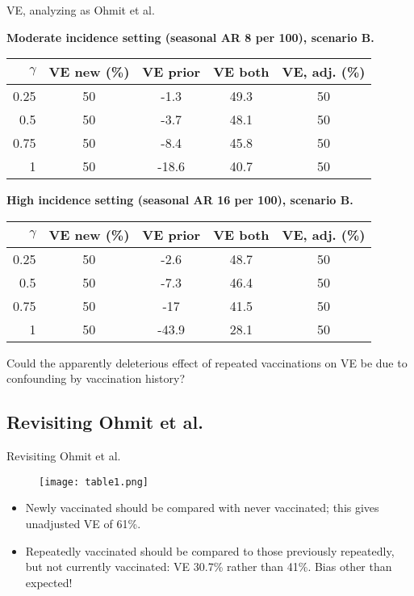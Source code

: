 \documentclass{beamer}
\begin{document}
 \begin{frame}{VE, analyzing as Ohmit et al.}
	
	{\footnotesize
		\textbf{Moderate incidence setting (seasonal AR 8 per 100), scenario B.}
		\begin{table}
			\begin{tabular}{rcccc}
				$\gamma$ & VE new (\%) & VE prior & VE both & VE, adj.  (\%) \\
				\hline
				0.25 & 50 & -1.3 & 49.3 & 50 \\ 
				0.5 & 50 & -3.7 & 48.1 & 50 \\ 
				0.75 & 50 & -8.4 & 45.8 & 50 \\ 
				1 & 50 & -18.6 & 40.7 & 50 \\ 
				\hline
			\end{tabular}
		\end{table}
		
		
		\textbf{High incidence setting (seasonal AR 16 per 100), scenario B.}
		\begin{table}
			\begin{tabular}{rcccc}
				$\gamma$ & VE new (\%) & VE prior & VE both & VE, adj.  (\%) \\
				\hline
				0.25 & 50 & -2.6 & 48.7 & 50 \\ 
				0.5 & 50 & -7.3 & 46.4 & 50 \\ 
				0.75 & 50 & -17 & 41.5 & 50 \\ 
				1 & 50 & -43.9 & 28.1 & 50 \\ 
				\hline
			\end{tabular}
		\end{table}
	}
\end{frame}
%
%
\begin{frame}
	{Could the apparently deleterious effect of repeated vaccinations on VE be due to confounding by vaccination history?}
	
	\centering
\end{frame}
%
\subsection{Revisiting Ohmit et al.}
\begin{frame}{Revisiting Ohmit et al.}
		\begin{figure}
		\texttt{[image: table1.png]}
	\end{figure}
	\begin{itemize}
		\item Newly vaccinated should be compared with never vaccinated; this gives unadjusted VE of 61\%.
		\item Repeatedly vaccinated should be compared to those previously repeatedly, but not currently vaccinated: VE 30.7\% rather than 41\%.  Bias other than expected!
		
	\end{itemize}
\end{frame}
%
%
\end{document}
